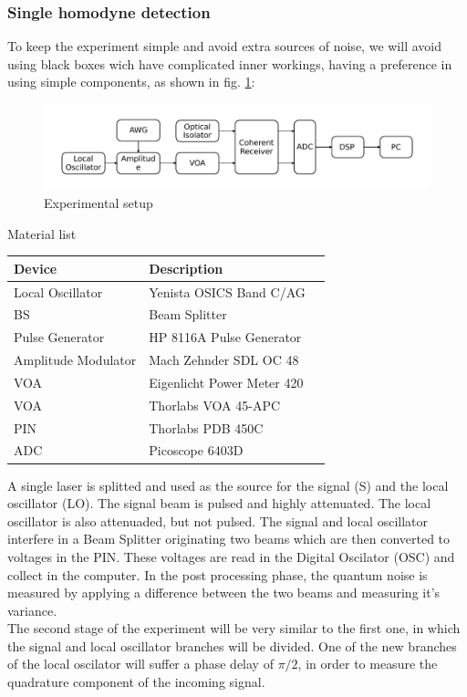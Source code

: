 \subsubsection{Single homodyne detection}
%
To keep the experiment simple and avoid extra sources of noise, we will avoid using black boxes wich have complicated inner workings, having a preference in using simple components, as shown in fig. \ref{fig:experimental_homodyne_setup}:
\\
\begin{figure}[H]
	\centering
	\includegraphics{./sdf/optical_detection/figures/scheme_experimental.pdf}
	\caption{Experimental setup}
	\label{fig:experimental_homodyne_setup}
\end{figure}
%
%
Material list
\begin{table}[H]
	\centering
	\begin{tabulary}{1.0\textwidth}{|L|L|l|}
		\hline
		\textbf{Device}		& \textbf{Description}\\
		\hline
		Local Oscillator	& Yenista OSICS Band C/AG\\
		\hline
		BS					& Beam Splitter\\
		\hline
		Pulse Generator		& HP 8116A Pulse Generator\\
		\hline
		Amplitude Modulator	& Mach Zehnder SDL OC 48\\
		\hline
		VOA					& Eigenlicht Power Meter 420\\
		\hline
		VOA					& Thorlabs VOA 45-APC\\
		\hline
		PIN					& Thorlabs PDB 450C\\
		\hline
		ADC					& Picoscope 6403D\\
		\hline
	\end{tabulary}
\end{table}
%
A single laser is splitted and used as the source for the signal (S) and the local oscillator (LO). The signal beam is pulsed and highly attenuated. The local oscillator is also attenuaded, but not pulsed. The signal and local oscillator interfere in a Beam Splitter originating two beams which are then converted to voltages in the PIN. These voltages are read in the Digital Oscilator (OSC) and collect in the computer. In the post processing phase, the quantum noise is measured by applying a difference between the two beams and measuring it's variance.
\\
The second stage of the experiment will be very similar to the first one, in which the signal and local oscillator branches will be divided. One of the new branches of the local oscilator will suffer a phase delay of $\pi/2$, in order to measure the quadrature component of the incoming signal.\\

